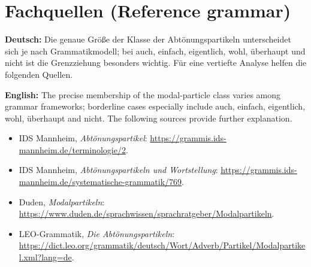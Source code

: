 \documentclass[a4paper,11pt]{article}
\newcommand{\GermanText}[1]{\textbf{Deutsch: }#1\par}
\newcommand{\EnglishText}[1]{{\small\color{SoftGray}\textbf{English: }#1\par}}
\begin{document}
\section{Fachquellen \textnormal{(Reference grammar)}}
\GermanText{Die genaue Größe der Klasse der Abtönungspartikeln unterscheidet sich je nach Grammatikmodell; bei auch, einfach, eigentlich, wohl, überhaupt und nicht ist die Grenzziehung besonders wichtig. Für eine vertiefte Analyse helfen die folgenden Quellen.}
\EnglishText{The precise membership of the modal-particle class varies among grammar frameworks; borderline cases especially include auch, einfach, eigentlich, wohl, überhaupt and nicht. The following sources provide further explanation.}
\begin{itemize}
\item IDS Mannheim, \emph{Abtönungspartikel}: \url{https://grammis.ids-mannheim.de/terminologie/2}.
\item IDS Mannheim, \emph{Abtönungspartikeln und Wortstellung}: \url{https://grammis.ids-mannheim.de/systematische-grammatik/769}.
\item Duden, \emph{Modalpartikeln}: \url{https://www.duden.de/sprachwissen/sprachratgeber/Modalpartikeln}.
\item LEO-Grammatik, \emph{Die Abtönungspartikeln}: \url{https://dict.leo.org/grammatik/deutsch/Wort/Adverb/Partikel/Modalpartikel.xml?lang=de}.
\end{itemize}
\end{document}
